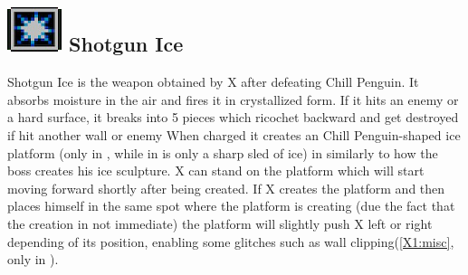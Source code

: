 \subsection{\includegraphics[scale=0.2]{figures/X1/Chill_penguin/Shot_I.png} Shotgun Ice}\label{Shotgun_ice}
Shotgun Ice is the weapon obtained by X after defeating Chill Penguin. It absorbs moisture in the air and fires it in crystallized form. If it hits an enemy or a hard surface, it breaks into 5 pieces which ricochet backward and get destroyed if hit another wall or enemy When charged it creates an Chill Penguin-shaped ice platform (only in \x, while in \mhx is only a sharp sled of ice) in similarly to how the boss creates his ice sculpture. X can stand on the platform which will start moving forward shortly after being created. If X creates the platform and then places himself in the same spot where the platform is creating (due the fact that the creation in not immediate) the platform will slightly push X left or right depending of its position, enabling some glitches such as wall clipping(\ref{X1:misc}, only in \x).
